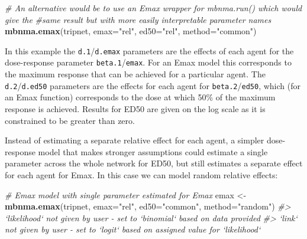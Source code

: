 \documentclass[]{article}
\newenvironment{Shaded}{\begin{snugshade}}{\end{snugshade}}
\newcommand{\CommentTok}[1]{\textcolor[rgb]{0.56,0.35,0.01}{\textit{#1}}}
\newcommand{\DataTypeTok}[1]{\textcolor[rgb]{0.13,0.29,0.53}{#1}}
\newcommand{\KeywordTok}[1]{\textcolor[rgb]{0.13,0.29,0.53}{\textbf{#1}}}
\newcommand{\NormalTok}[1]{#1}
\newcommand{\StringTok}[1]{\textcolor[rgb]{0.31,0.60,0.02}{#1}}
\begin{document}
\begin{Shaded}
\begin{Highlighting}[]
\CommentTok{# An alternative would be to use an Emax wrapper for mbnma.run() which would give the }
\CommentTok{#same result but with more easily interpretable parameter names}
\KeywordTok{mbnma.emax}\NormalTok{(tripnet, }\DataTypeTok{emax=}\StringTok{"rel"}\NormalTok{, }\DataTypeTok{ed50=}\StringTok{"rel"}\NormalTok{, }\DataTypeTok{method=}\StringTok{"common"}\NormalTok{)}
\end{Highlighting}
\end{Shaded}

In this example the \texttt{d.1}/\texttt{d.emax} parameters are the
effects of each agent for the dose-response parameter
\texttt{beta.1}/\texttt{emax}. For an Emax model this corresponds to the
maximum response that can be achieved for a particular agent. The
\texttt{d.2}/\texttt{d.ed50} parameters are the effects for each agent
for \texttt{beta.2}/\texttt{ed50}, which (for an Emax function)
corresponds to the dose at which 50\% of the maximum response is
achieved. Results for ED50 are given on the log scale as it is
constrained to be greater than zero.

Instead of estimating a separate relative effect for each agent, a
simpler dose-response model that makes stronger assumptions could
estimate a single parameter across the whole network for ED50, but still
estimates a separate effect for each agent for Emax. In this case we can
model random relative effects:

\begin{Shaded}
\begin{Highlighting}[]
\CommentTok{# Emax model with single parameter estimated for Emax}
\NormalTok{emax <-}\StringTok{ }\KeywordTok{mbnma.emax}\NormalTok{(tripnet, }\DataTypeTok{emax=}\StringTok{"rel"}\NormalTok{, }\DataTypeTok{ed50=}\StringTok{"common"}\NormalTok{, }\DataTypeTok{method=}\StringTok{"random"}\NormalTok{)}
\CommentTok{#> `likelihood` not given by user - set to `binomial` based on data provided}
\CommentTok{#> `link` not given by user - set to `logit` based on assigned value for `likelihood`}
\end{Highlighting}
\end{Shaded}
\end{document}
